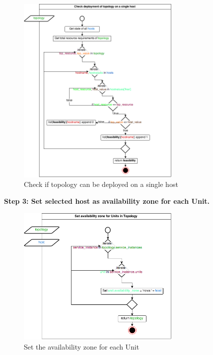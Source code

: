 \begin{figure}[H]
\centering

\includegraphics[width=0.7\textwidth]{images/design/cm_single_host_check}

\caption{Check if topology can be deployed on a single host}
\end{figure}


\textbf{Step 3: Set selected host as availability zone for each Unit.}

\begin{figure}[H]
\centering

\includegraphics[width=0.7\textwidth]{images/design/cm_set_az_topology}

\caption{Set the availability zone for each Unit}
\end{figure}


